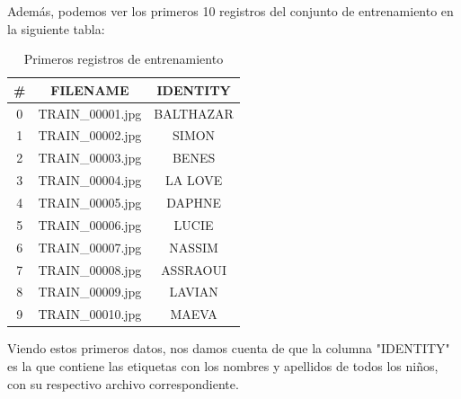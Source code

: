 \documentclass[10pt]{article}
\begin{document}
	\newpage
	Además, podemos ver los primeros 10 registros del conjunto de entrenamiento en la siguiente tabla: \par
	\begin{table}[!ht]
		\centering
		\caption{Primeros registros de entrenamiento}
		\begin{tabular}{|c|c|c|}
			\hline
			\# & FILENAME & IDENTITY \\
			\hline
			0 & TRAIN\_00001.jpg & BALTHAZAR \\
			\hline
			1 & TRAIN\_00002.jpg & SIMON \\
			\hline
			2 & TRAIN\_00003.jpg & BENES \\
			\hline
			3 & TRAIN\_00004.jpg & LA LOVE \\
			\hline
			4 & TRAIN\_00005.jpg & DAPHNE \\
			\hline
			5 & TRAIN\_00006.jpg & LUCIE \\
			\hline
			6 & TRAIN\_00007.jpg & NASSIM \\
			\hline
			7 & TRAIN\_00008.jpg & ASSRAOUI \\
			\hline
			8 & TRAIN\_00009.jpg & LAVIAN \\
			\hline
			9 & TRAIN\_00010.jpg & MAEVA \\
			\hline
		\end{tabular}
	\end{table}
	Viendo estos primeros datos, nos damos cuenta de que la columna "IDENTITY" es la que contiene las etiquetas con los nombres y apellidos de todos los niños, con su respectivo archivo correspondiente.
	
\end{document}

